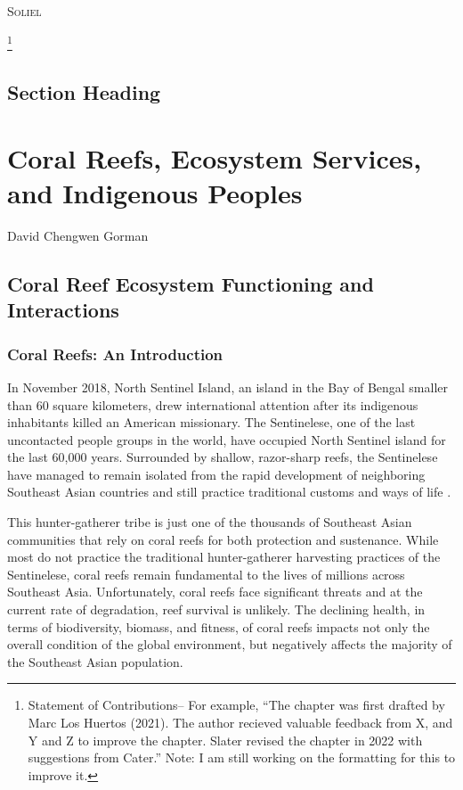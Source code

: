 \documentclass{book}\usepackage{knitr}
\makeatletter
\newcommand{\chapterauthor}[1]{%
  {\parindent0pt\vspace*{-25pt}%
  \linespread{1.1}\large\scshape#1%
  \par\nobreak\vspace*{35pt}}
  \@afterheading%
}
\makeatother
\begin{document}
\chapterauthor{Soliel}

\footnote{Statement of Contributions-- For example, ``The chapter was first drafted by Marc Los Huertos (2021). The author recieved valuable feedback from X, and Y and Z to improve the chapter. Slater revised the chapter in 2022 with suggestions from Cater.'' Note: I am still working on the formatting for this to improve it.}

\section{Section Heading}%



\chapter{Coral Reefs, Ecosystem Services, and Indigenous Peoples}

David Chengwen Gorman

\section{Coral Reef Ecosystem Functioning and Interactions}

\subsection{Coral Reefs: An Introduction}

In November 2018, North Sentinel Island, an island in the Bay of Bengal smaller than 60 square kilometers, drew international attention after its indigenous inhabitants killed an American missionary.  The Sentinelese, one of the last uncontacted people groups in the world, have occupied North Sentinel island for the last 60,000 years. Surrounded by shallow, razor-sharp reefs, the Sentinelese have managed to remain isolated from the rapid development of neighboring Southeast Asian countries and still practice traditional customs and ways of life \citep{Smith}.

This hunter-gatherer tribe is just one of the thousands of Southeast Asian communities that rely on coral reefs for both protection and sustenance. While most do not practice the traditional hunter-gatherer harvesting practices of the Sentinelese, coral reefs remain fundamental to the lives of millions across Southeast Asia. Unfortunately, coral reefs face significant threats and at the current rate of degradation, reef survival is unlikely. The declining health, in terms of biodiversity, biomass, and fitness, of coral reefs impacts not only the overall condition of the global environment, but negatively affects the majority of the Southeast Asian population.
\end{document}

